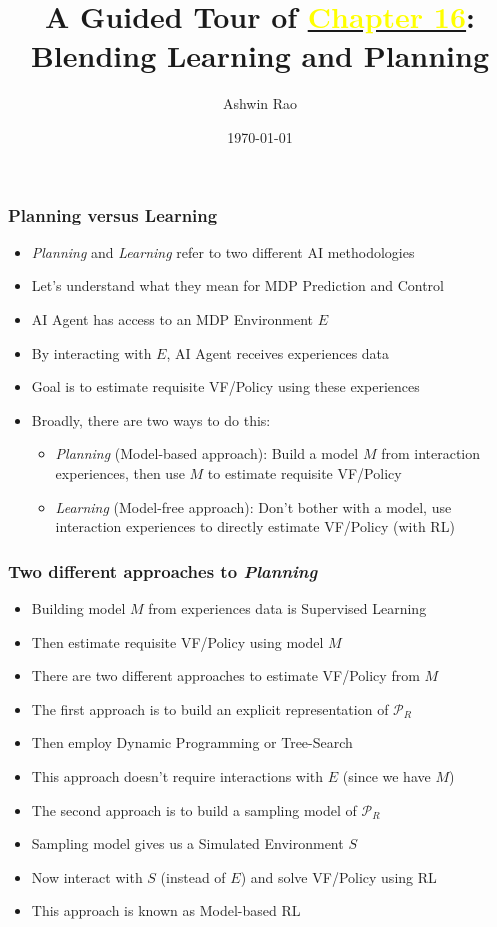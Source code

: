 \documentclass[handout]{beamer}
\title[Blending Learning and Planning Chapter]{A Guided Tour of \href{http://stanford.edu/~ashlearn/RLForFinanceBook/book.pdf}{\underline{\textcolor{yellow}{Chapter 16}}}: \\ Blending Learning and Planning} %
\author{Ashwin Rao} %
\institute[Stanford] %
{
ICME, Stanford University
}
\date{\today} %
\begin{document}
\begin{frame}
\titlepage %
\end{frame}

\begin{frame}
\frametitle{Planning versus Learning}
\pause
\begin{itemize}[<+->]
\item {\em Planning} and {\em Learning} refer to two different AI methodologies
\item Let's understand what they mean for MDP Prediction and Control
\item AI Agent has access to an MDP Environment $E$
\item By interacting with $E$, AI Agent receives experiences data
\item Goal is to estimate requisite VF/Policy using these experiences
\item Broadly, there are two ways to do this:
\begin{itemize}[<+->]
\item {\em Planning} (Model-based approach): Build a model $M$ from interaction experiences, then use $M$ to estimate requisite VF/Policy
\item {\em Learning} (Model-free approach): Don't bother with a model, use interaction experiences to directly estimate VF/Policy (with RL)
\end{itemize}
\end{itemize}
\end{frame}


\begin{frame}
\frametitle{Two different approaches to {\em Planning}}
\pause
\begin{itemize}[<+->]
\item Building model $M$ from experiences data is Supervised Learning
\item Then estimate requisite VF/Policy using model $M$
\item There are two different approaches to estimate VF/Policy from $M$
\item The first approach is to build an explicit representation of  $\mathcal{P}_R$
\item Then employ Dynamic Programming or Tree-Search
\item This approach doesn't require interactions with $E$ (since we have $M$)
\item The second approach is to build a sampling model of $\mathcal{P}_R$
\item Sampling model gives us a Simulated Environment $S$
\item Now interact with $S$ (instead of $E$) and solve VF/Policy using RL
\item This approach is known as Model-based RL
\end{itemize}
\end{frame}
\end{document}
